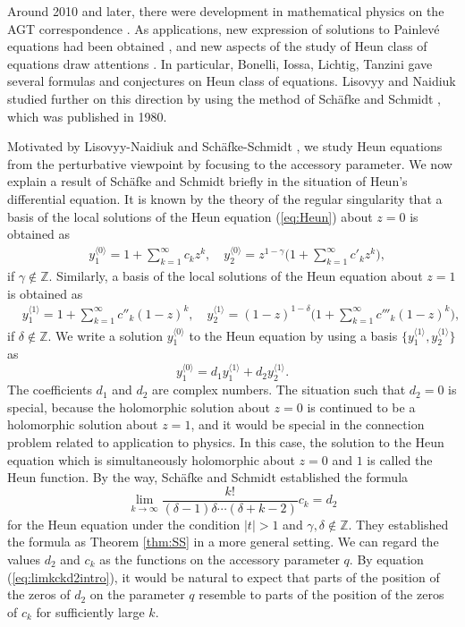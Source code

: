 \documentclass[12pt]{amsart}
\newcommand{\Zint}{\mathbb {Z}}
\numberwithin{equation}{section}
\theoremstyle{definition}
\theoremstyle{remark}
\begin{document}
Around 2010 and later, there were development in mathematical physics on the AGT correspondence \cite{AGT}.
As applications, new expression of solutions to Painlev\'e equations had been obtained \cite{ILT,LLNZ}, and new aspects of the study of Heun class of equations draw attentions \cite{PP}.
In particular, Bonelli, Iossa, Lichtig, Tanzini \cite{BIPT2} gave several formulas and conjectures on Heun class of equations.
Lisovyy and Naidiuk \cite{LN} studied further on this direction by using the method of Sch{\"a}fke and Schmidt \cite{SS}, which was published in 1980.

Motivated by Lisovyy-Naidiuk \cite{LN} and Sch{\"a}fke-Schmidt \cite{SS}, we study Heun equations from the perturbative viewpoint by focusing to the accessory parameter.
We now explain a result of Sch{\"a}fke and Schmidt briefly in the situation of Heun's differential equation.
It is known by the theory of the regular singularity that a basis of the local solutions of the Heun equation (\ref{eq:Heun}) about $z=0$ is obtained as
\begin{align}
& y^{\langle 0 \rangle} _1  = 1 + \sum _{k=1}^{\infty } c_k  z^k  , \quad  y^{\langle 0 \rangle} _2  = z^{1- \gamma } \Big( 1 +\sum _{k=1}^{\infty } c' _k z^k  \Big) , 
\end{align}
if $\gamma \not \in \Zint $.
Similarly, a basis of the local solutions of the Heun equation about $z=1$ is obtained as
\begin{align}
& y^{\langle 1 \rangle} _1  =  1+ \sum _{k=1}^{\infty } c '' _k (1-z)^k ,\quad  y^{\langle 1 \rangle} _2  = (1-z)^{1 -\delta } \Big( 1 +\sum _{k=1}^{\infty } c''' _k (1-z)^k  \Big) ,
\label{eq:Hlz=1}
\end{align}
if $\delta \not \in \Zint $.
We write a solution $ y^{\langle 0 \rangle} _1$ to the Heun equation by using a basis $\{  y^{\langle 1 \rangle} _1  , y^{\langle 1 \rangle} _2  \} $ as  
\begin{equation}
 y^{\langle 0 \rangle} _1 = d_{1}  y^{\langle 1 \rangle} _1  + d_2 y^{\langle 1 \rangle} _2 .
\end{equation}
The coefficients $d_1$ and $d_2 $ are complex numbers.
The situation such that $d_2 =0$ is special, because the holomorphic solution about $z=0$ is continued to be a holomorphic solution about $z=1$, and it would be special in the connection problem related to application to physics.
In this case, the solution to the Heun equation which is simultaneously holomorphic about $z=0$ and $1$ is called the Heun function.
By the way, Sch{\"a}fke and Schmidt \cite{SS} established the formula 
\begin{equation}
\lim _{k \to \infty} \frac{ k! }{ (\delta -1) \delta  \cdots (\delta  +k -2)} c_k = d_2 
\label{eq:limkckd2intro}
\end{equation}
for the Heun equation under the condition $|t| >1$ and $\gamma ,\delta \not \in \Zint $.
They established the formula as Theorem \ref{thm:SS} in a more general setting.
We can regard the values $d_2 $ and $c_k$ as the functions on the accessory parameter $q$.
By equation (\ref{eq:limkckd2intro}), it would be natural to expect that parts of the position of the zeros of $d_2$ on the parameter $q$ resemble to parts of the position of the zeros of $c_k$ for sufficiently large $k$.
\end{document}
